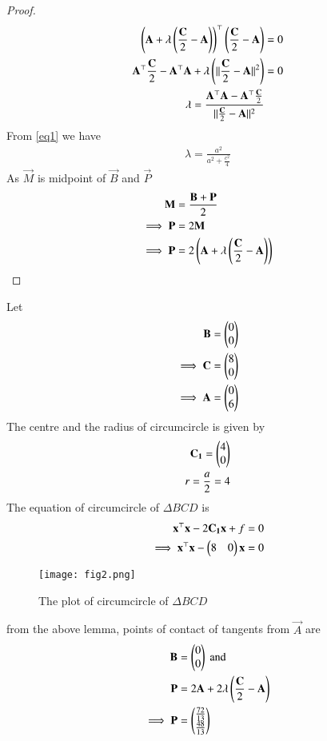 \documentclass[journal,12pt,twocolumn]{IEEEtran}
\begin{document}
\begin{proof}
\begin{align}
    \left(\mathbf{A}+\lambda\left(\frac{\mathbf{C}}{2}-\mathbf{A}\right)\right)^\top\left(\frac{\mathbf{C}}{2}-\mathbf{A}\right)&=0\\
    \mathbf{A}^\top\frac{\mathbf{C}}{2}-\mathbf{A}^\top\mathbf{A}+\lambda\left(\lVert\frac{\mathbf{C}}{2}-\mathbf{A}\rVert^2\right)&=0\\
    \lambda=\frac{\mathbf{A}^\top\mathbf{A}-\mathbf{A}^\top\frac{\mathbf{C}}{2}}{\lVert\frac{\mathbf{C}}{2}-\mathbf{A}\rVert^2}
\end{align}
From \ref{eq1} we have
\begin{align}
    \lambda=\frac{a^{2}}{a^{2}+\frac{c^{2}}{4}}
\end{align}
As $\vec{M}$ is midpoint of $\vec{B}$ and $\vec{P}$
\begin{align}
    \mathbf{M}&=\frac{\mathbf{B}+\mathbf{P}}{2}\\
    \implies
    \mathbf{P}&=2\mathbf{M}\\
    \implies \mathbf{P}&=2\left(\mathbf{A}+\lambda\left(\frac{\mathbf{C}}{2}-\mathbf{A}\right)\right)
\end{align}

\end{proof}
Let
\begin{align}
    \mathbf{B}=\begin{pmatrix}0\\0\end{pmatrix}\\
    \implies \mathbf{C}=\begin{pmatrix}8\\0\end{pmatrix} \\
    \implies  \mathbf{A}=\begin{pmatrix}0\\6\end{pmatrix}
\end{align}
The centre and the radius of circumcircle is given by 
\begin{align}
    \mathbf{C_1}=\begin{pmatrix}4\\0\end{pmatrix}\\
    r = \frac{a}{2}=4
\end{align}
The equation of circumcircle of $\Delta BCD$ is 
\begin{align}
    \mathbf{x}^\top\mathbf{x}-2\mathbf{C_1}\mathbf{x}+f &=0\\
    \implies \mathbf{x}^\top\mathbf{x}-\begin{pmatrix}8&0\end{pmatrix}\mathbf{x}&=0
    \label{eq4}
\end{align}
\begin{figure}[!ht]
   \centering
   \texttt{[image: fig2.png]}
   \caption{The plot of circumcircle of $\Delta BCD$}
\end{figure}
from the above lemma, points of contact of tangents from $\vec{A}$ are
\begin{align}
    \mathbf{B}&=\begin{pmatrix}0\\0\end{pmatrix} \text{  and}\\
    \mathbf{P}&=2\mathbf{A}+2\lambda\left(\frac{\mathbf{C}}{2}-\mathbf{A}\right)\\
   \implies \mathbf{P}&=\begin{pmatrix}\frac{72}{13}\\ \frac{48}{13}\end{pmatrix}
\end{align}
\end{document}
